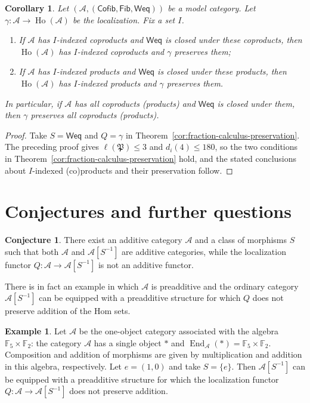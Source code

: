 \documentclass[10pt,a4paper]{amsart}
\theoremstyle{plain}
\newtheorem{corollary}[theorem]{Corollary}
\theoremstyle{definition}
\newtheorem{example}[theorem]{Example}
\newtheorem{conjecture}[theorem]{Conjecture}
\theoremstyle{remark}
\begin{document}
\begin{corollary}\label{cor:model-category-preservation}
  Let $(\mathcal A, (\mathsf{Cofib}, \mathsf{Fib}, \mathsf{Weq}))$ be a model category.
  Let $\gamma:\mathcal A\longrightarrow\operatorname{Ho}(\mathcal A)$ be the localization.
  Fix a set $I$.
  \begin{enumerate}[label=\textup{(\arabic*)}]
    \item If $\mathcal A$ has $I$-indexed coproducts and $\mathsf{Weq}$ is closed under these coproducts, then $\operatorname{Ho}(\mathcal A)$ has $I$-indexed coproducts and $\gamma$ preserves them;
    \item If $\mathcal A$ has $I$-indexed products and $\mathsf{Weq}$ is closed under these products, then $\operatorname{Ho}(\mathcal A)$ has $I$-indexed products and $\gamma$ preserves them.
  \end{enumerate}
  In particular, if $\mathcal A$ has all coproducts (products) and $\mathsf{Weq}$ is closed under them, then $\gamma$ preserves all coproducts (products).
\end{corollary}

\begin{proof}
  Take $S=\mathsf{Weq}$ and $Q=\gamma$ in Theorem~\ref{cor:fraction-calculus-preservation}.
  The preceding proof gives $\ell(\mathfrak P)\leq3$ and $d_i(4)\leq180$, so the two conditions in Theorem~\ref{cor:fraction-calculus-preservation} hold, and the stated conclusions about $I$-indexed (co)products and their preservation follow.
\end{proof}

\section{Conjectures and further questions}\label{sec:conjectures-and-problems}
\begin{conjecture}\label{conj:nonautomatic-additivity}
  There exist an additive category $\mathcal A$ and a class of morphisms $S$ such that both $\mathcal A$ and $\mathcal A[S^{-1}]$ are additive categories, while the localization functor $Q:\mathcal A\longrightarrow\mathcal A[S^{-1}]$ is not an additive functor.
\end{conjecture}

There is in fact an example in which $\mathcal A$ is preadditive and the ordinary category $\mathcal A[S^{-1}]$ can be equipped with a preadditive structure for which $Q$ does not preserve addition of the Hom sets.

\begin{example}\label{ex:preadditive-nonadditive-localization}
  Let $\mathcal A$ be the one-object category associated with the algebra $\mathbb F_5\times\mathbb F_2$: the category $\mathcal A$ has a single object $*$ and $\operatorname{End}_{\mathcal A}(*)=\mathbb F_5\times\mathbb F_2$.
  Composition and addition of morphisms are given by multiplication and addition in this algebra, respectively.
  Let $e=(1,0)$ and take $S=\{e\}$.
  Then $\mathcal A[S^{-1}]$ can be equipped with a preadditive structure for which the localization functor $Q:\mathcal A\longrightarrow \mathcal{A}[S^{-1}]$ does not preserve addition.
\end{example}
\end{document}

